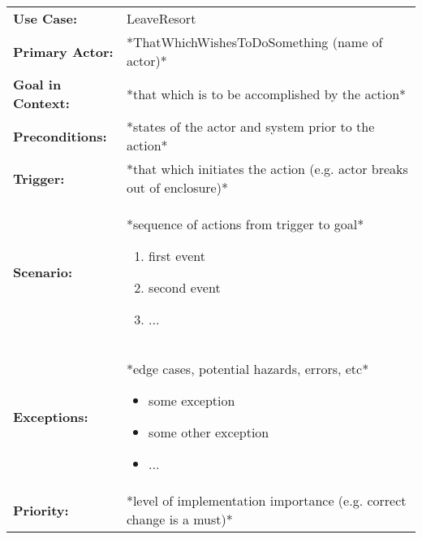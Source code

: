 \documentclass[12pt]{article}
\begin{document}
    \begin{table}[H]
    \begin{tabular}{lp{9.9cm}}
        \hline
        \textbf{Use Case:}                     & LeaveResort \\

        \textbf{Primary Actor:}                & *ThatWhichWishesToDoSomething (name of actor)*\\

        \textbf{Goal in Context:}              & *that which is to be accomplished by the action* \\

        \textbf{Preconditions:}                & *states of the actor and system prior to the action* \\

        \textbf{Trigger:}                      & *that which initiates the action (e.g. actor breaks out of enclosure)*\\

        \textbf{Scenario:}                     & *sequence of actions from trigger to goal*
                                                 \begin{enumerate}
                                                     \item first event
                                                     \item second event
                                                     \item ...
                                                 \end{enumerate} \\

        \textbf{Exceptions:}                   & *edge cases, potential hazards, errors, etc*
                                                 \begin{itemize}
                                                     \item[] some exception
                                                     \item[] some other exception
                                                     \item[] ...
                                                 \end{itemize}\\

        \textbf{Priority:}                     & *level of implementation importance (e.g. correct change is a must)*\\


\end{tabular}
\end{table}
\end{document}
